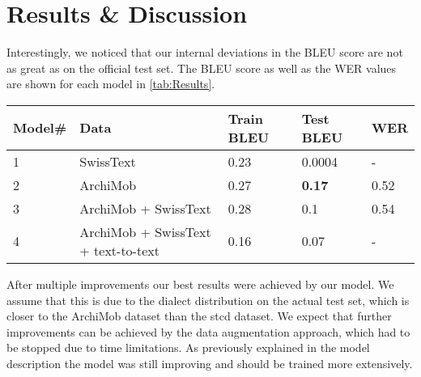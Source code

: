 \section{Results \& Discussion}
Interestingly, we noticed that our internal deviations in the BLEU score are not as great as on the official test set. The BLEU score as well as the WER values are shown for each model in
\cref{tab:Results}.

\begin{table*}[!t]
    \centering
    \begin{tabular}{lllll}
    \hline\textbf{Model\#}    & \textbf{Data} & \textbf{Train BLEU}   & \textbf{Test BLEU}  & \textbf{WER}  \\\hline
    1                   & SwissText     & 0.23                  &  0.0004 & -              \\
    2                   & ArchiMob      & 0.27                  & \textbf{0.17}             & 0.52             \\
    3                   & ArchiMob + SwissText      & 0.28                  & 0.1                      & 0.54               \\
    4                   & ArchiMob + SwissText + text-to-text      & 0.16                  & 0.07                      & -              \\
    \hline
    \end{tabular}
    \caption{Results}
    \label{tab:Results}
\end{table*}
After multiple improvements our best results were achieved by our  model. We assume that this is due to the dialect distribution on the actual test set, which is closer to the ArchiMob dataset
than the \gls{stcd} dataset. We expect that further improvements can be achieved by the data augmentation approach, which had to be stopped due to time limitations. As previously explained in the
model description the  model was still improving and should be trained more extensively.
